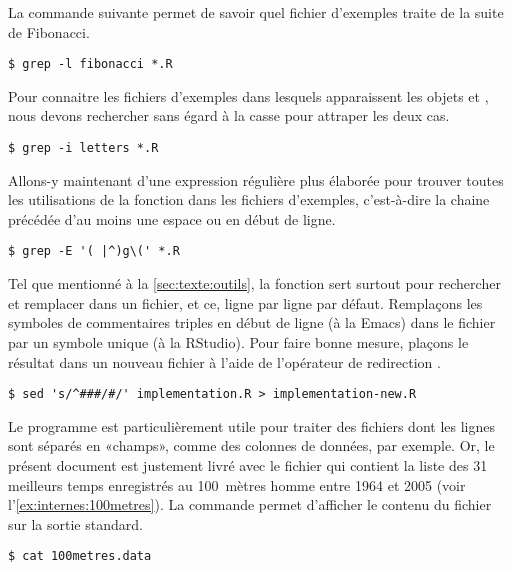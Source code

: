 La commande suivante permet de savoir quel fichier d'exemples traite
de la suite de Fibonacci.
\begin{Schunk}
\begin{Verbatim}
$ grep -l fibonacci *.R
\end{Verbatim}
\end{Schunk}

Pour connaitre les fichiers d'exemples dans lesquels apparaissent les
objets  et , nous devons rechercher sans
égard à la casse pour attraper les deux cas.
\begin{Schunk}
\begin{Verbatim}
$ grep -i letters *.R
\end{Verbatim}
\end{Schunk}

Allons-y maintenant d'une expression régulière plus élaborée pour
trouver toutes les utilisations de la fonction  dans les
fichiers d'exemples, c'est-à-dire la chaine  précédée d'au
moins une espace ou en début de ligne.
\begin{Schunk}
\begin{Verbatim}
$ grep -E '( |^)g\(' *.R
\end{Verbatim}
\end{Schunk}

Tel que mentionné à la \autoref{sec:texte:outils}, la fonction
 sert surtout pour rechercher et remplacer dans un fichier,
et ce, ligne par ligne par défaut. Remplaçons les symboles de
commentaires triples \code{\#\#\#} en début de ligne (à la Emacs) dans
le fichier  par un symbole unique \code{\#} (à
la RStudio). Pour faire bonne mesure, plaçons le résultat dans un
nouveau fichier  à l'aide de l'opérateur de
redirection \code{>}.
\begin{Schunk}
\begin{Verbatim}
$ sed 's/^###/#/' implementation.R > implementation-new.R
\end{Verbatim}
\end{Schunk}

Le programme  est particulièrement utile pour traiter des
fichiers dont les lignes sont séparés en «champs», comme des colonnes
de données, par exemple. Or, le présent document est justement livré
avec le fichier  qui contient la liste des 31
meilleurs temps enregistrés au 100~mètres homme entre 1964 et 2005
(voir l'\autoref{ex:internes:100metres}). La commande 
permet d'afficher le contenu du fichier sur la sortie standard.
\begin{Schunk}
\begin{Verbatim}
$ cat 100metres.data
\end{Verbatim}
\end{Schunk}


